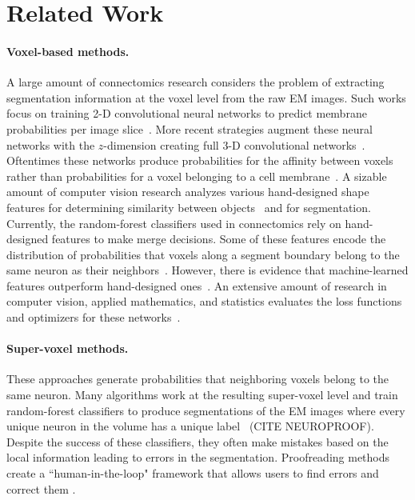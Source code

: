 \section{Related Work}

\paragraph{Voxel-based methods.} A large amount of connectomics research considers the problem of extracting segmentation information at the voxel level from the raw EM images. 
Such works focus on training 2-D convolutional neural networks to predict membrane probabilities per image slice~\cite{ciresan2012deep,jain2010boundary,amelio_segmentation,rhoananet,kaynig2015large}. 
More recent strategies augment these neural networks with the $z$-dimension creating full 3-D convolutional networks~\cite{lee2015recursive}.
Oftentimes these networks produce probabilities for the affinity between voxels rather than probabilities for a voxel belonging to a cell membrane~\cite{ronneberger2015u}. 
A sizable amount of computer vision research analyzes various hand-designed shape features for determining similarity between objects~\cite{osada2002shape} and for segmentation\cite{conners1984segmentation}. 
Currently, the random-forest classifiers used in connectomics rely on hand-designed features to make merge decisions.
Some of these features encode the distribution of probabilities that voxels along a segment boundary belong to the same neuron as their neighbors~\cite{nunez2014graph,ren2003learning}.
However, there is evidence that machine-learned features outperform hand-designed ones~\cite{bogovic2013learned}.
An extensive amount of research in computer vision, applied mathematics, and statistics evaluates the loss functions and optimizers for these networks~\cite{chatfield2014return,maas2013rectifier,nesterov1983method}. 

\paragraph{Super-voxel methods.} These approaches generate probabilities that neighboring voxels belong to the same neuron.
Many algorithms work at the resulting super-voxel level and train random-forest classifiers to produce segmentations of the EM images where every unique neuron in the volume has a unique label~\cite{seymour2016rhoananet,nunez2014graph,parag2017anisotropic,zlateski2015image} (CITE NEUROPROOF). 
Despite the success of these classifiers, they often make mistakes based on the local information leading to errors in the segmentation. 
Proofreading methods create a ``human-in-the-loop" framework that allows users to find errors and correct them \cite{haehn2017scalable,haehn2017guided,haehn2014design,error_correction_using_CNN}. 

